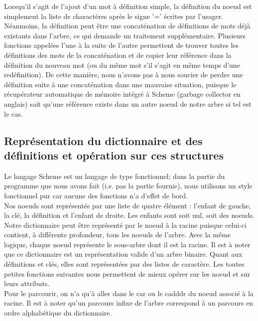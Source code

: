 \documentclass[french]{article}
\begin{document}
		Lorsqu'il s'agit de l'ajout d'un mot à définition
				simple, la définition du noeud est simplement la liste de 
				charactères après le signe '=' écrites par l'usager. 
				Néanmoins, la définition peut
				être une concaténation de définitions de mots déjà existants 
				dans l'arbre, ce qui demande un traitement supplémentaire. 
				Plusieurs fonctions 
				appelées l'une à la suite de l'autre permettent de trouver 
				toutes les définitions des mots de la concaténation et de 
				copier leur référence
				dans la définition du nouveau mot (ou du même mot s'il s'agit 
				en même 
				temps d'une redéfinition). De cette manière, nous n'avons pas 
				à nous 
				soucier 		de perdre une définition suite à une 
				concaténation 
				dans 
				une mauvaise situation, puisque le récupérateur automatique de 
				mémoire 
				intégré à Scheme
				(garbage collector en anglais) sait qu'une référence existe 
				dans un autre noeud de notre arbre si tel est le cas.
	
		\subsection{Représentation du dictionnaire et des définitions et 
		opération sur ces structures}
			Le langage Scheme est un langage de type fonctionnel; dans la 
			partie du programme que nous avons fait (i.e. pas la partie 
			fournie), nous utilisons un style fonctionnel pur car aucune
		des fonctions n'a d'effet de bord. 
			\\
			Nos noeuds sont représentés par une liste de quatre élément : 
			l'enfant de gauche, la clé, la définition et l'enfant de droite. 
			Les enfants sont soit nul, soit des noeuds. Notre dictionnaire 
			peut être représenté par le noeud à la racine puisque celui-ci 
			contient, à différente profondeur, tous les noeuds de l'arbre. 
			Avec la même logique, chaque noeud représente le sous-arbre dont 
			il est la racine. Il est à noter que ce dictionnaire est un 
			représentation valide d'un arbre binaire. Quant aux définitions et 
			clés, elles sont représentées par des listes de caractère. 
					Les toutes petites 
			fonctions suivantes nous permettent de mieux opérer sur les noeud 
			et sur leurs attributs.
			\\
		
			
		
			 Pour le parcourir, on n'a qu'à aller dans le car ou le 
			cadddr du noeud
		associé à la racine. Il est à noter qu'un parcours infixe de l'arbre 
		correspond à un parcours en ordre alphabétique du dictionnaire.\\	
		
\end{document}

